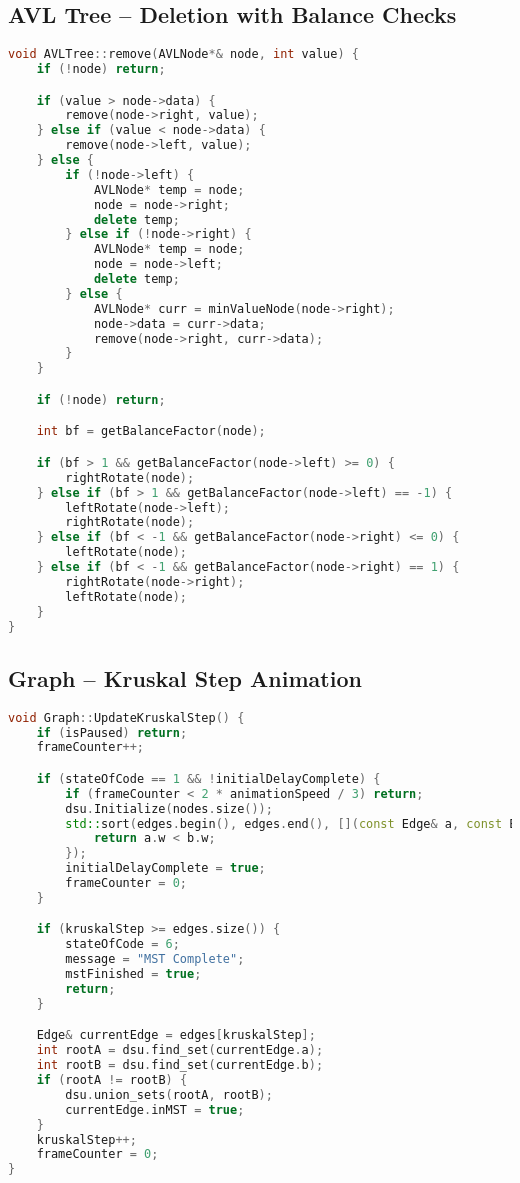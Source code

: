 \subsection*{AVL Tree – Deletion with Balance Checks}
\begin{lstlisting}[language=C++, caption={AVL Delete with Rotation Cases}]
void AVLTree::remove(AVLNode*& node, int value) {
    if (!node) return;

    if (value > node->data) {
        remove(node->right, value);
    } else if (value < node->data) {
        remove(node->left, value);
    } else {
        if (!node->left) {
            AVLNode* temp = node;
            node = node->right;
            delete temp;
        } else if (!node->right) {
            AVLNode* temp = node;
            node = node->left;
            delete temp;
        } else {
            AVLNode* curr = minValueNode(node->right);
            node->data = curr->data;
            remove(node->right, curr->data);
        }
    }

    if (!node) return;

    int bf = getBalanceFactor(node);

    if (bf > 1 && getBalanceFactor(node->left) >= 0) {
        rightRotate(node);
    } else if (bf > 1 && getBalanceFactor(node->left) == -1) {
        leftRotate(node->left);
        rightRotate(node);
    } else if (bf < -1 && getBalanceFactor(node->right) <= 0) {
        leftRotate(node);
    } else if (bf < -1 && getBalanceFactor(node->right) == 1) {
        rightRotate(node->right);
        leftRotate(node);
    }
}
\end{lstlisting}


\clearpage
\subsection*{Graph – Kruskal Step Animation}
\begin{lstlisting}[language=C++, caption={Step-by-Step Kruskal's MST Visualization}]
void Graph::UpdateKruskalStep() {
    if (isPaused) return;
    frameCounter++;

    if (stateOfCode == 1 && !initialDelayComplete) {
        if (frameCounter < 2 * animationSpeed / 3) return;
        dsu.Initialize(nodes.size());
        std::sort(edges.begin(), edges.end(), [](const Edge& a, const Edge& b) {
            return a.w < b.w;
        });
        initialDelayComplete = true;
        frameCounter = 0;
    }

    if (kruskalStep >= edges.size()) {
        stateOfCode = 6;
        message = "MST Complete";
        mstFinished = true;
        return;
    }

    Edge& currentEdge = edges[kruskalStep];
    int rootA = dsu.find_set(currentEdge.a);
    int rootB = dsu.find_set(currentEdge.b);
    if (rootA != rootB) {
        dsu.union_sets(rootA, rootB);
        currentEdge.inMST = true;
    }
    kruskalStep++;
    frameCounter = 0;
}
\end{lstlisting}
